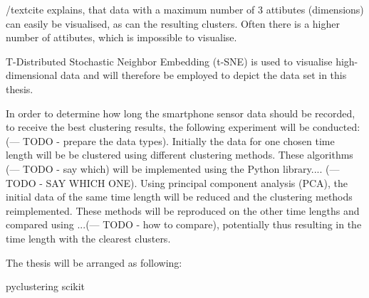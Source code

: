 \documentclass[12pt,a4paper]{article}
\begin{document}
 /textcite explains, that data with a maximum number of 3 attibutes (dimensions) can easily be visualised, as can the resulting clusters. Often there is a higher number of attibutes, which is impossible to visualise.

T-Distributed Stochastic Neighbor Embedding (t-SNE) is used to visualise high-dimensional data and will therefore be employed to depict the data set in this thesis.  

In order to determine how long the smartphone sensor data should be recorded, to receive the best clustering results, the following experiment will be conducted: (--- TODO - prepare the data types). Initially the data for one chosen time length will be be clustered using different clustering methods. These algorithms (--- TODO - say which) will be implemented using the Python library.... (--- TODO - SAY WHICH ONE). Using principal component analysis (PCA), the initial data of the same time length will be reduced and the clustering methods reimplemented. These methods will be reproduced on the other time lengths and compared using ...(--- TODO - how to compare), potentially thus resulting in the time length with the clearest clusters. 

The thesis will be arranged as following:


pyclustering
scikit










\end{document}
